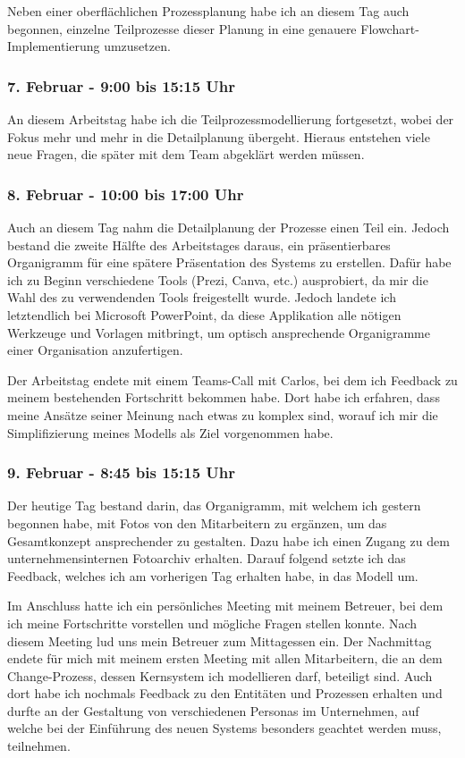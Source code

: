 Neben einer oberflächlichen Prozessplanung habe ich an diesem Tag auch begonnen, einzelne Teilprozesse dieser Planung in eine genauere Flowchart-Implementierung umzusetzen.

\subsubsection*{7. Februar - 9:00 bis 15:15 Uhr}
An diesem Arbeitstag habe ich die Teilprozessmodellierung fortgesetzt, wobei der Fokus mehr und mehr in die Detailplanung übergeht. Hieraus entstehen viele neue Fragen, die später mit dem Team abgeklärt werden müssen.

\subsubsection*{8. Februar - 10:00 bis 17:00 Uhr}
Auch an diesem Tag nahm die Detailplanung der Prozesse einen Teil ein. Jedoch bestand die zweite Hälfte des Arbeitstages daraus, ein präsentierbares Organigramm für eine spätere Präsentation des Systems zu erstellen. Dafür habe ich zu Beginn verschiedene Tools (Prezi, Canva, etc.) ausprobiert, da mir die Wahl des zu verwendenden Tools freigestellt wurde. Jedoch landete ich letztendlich bei Microsoft PowerPoint, da diese Applikation alle nötigen Werkzeuge und Vorlagen mitbringt, um optisch ansprechende Organigramme einer Organisation anzufertigen. 

Der Arbeitstag endete mit einem Teams-Call mit Carlos, bei dem ich Feedback zu meinem bestehenden Fortschritt bekommen habe. Dort habe ich erfahren, dass meine Ansätze seiner Meinung nach etwas zu komplex sind, worauf ich mir die Simplifizierung meines Modells als Ziel vorgenommen habe.

\subsubsection*{9. Februar - 8:45 bis 15:15 Uhr}
Der heutige Tag bestand darin, das Organigramm, mit welchem ich gestern begonnen habe, mit Fotos von den Mitarbeitern zu ergänzen, um das Gesamtkonzept ansprechender zu gestalten. Dazu habe ich einen Zugang zu dem unternehmensinternen Fotoarchiv erhalten.
Darauf folgend setzte ich das Feedback, welches ich am vorherigen Tag erhalten habe, in das Modell um.

Im Anschluss hatte ich ein persönliches Meeting mit meinem Betreuer, bei dem ich meine Fortschritte vorstellen und mögliche Fragen stellen konnte. Nach diesem Meeting lud uns mein Betreuer zum Mittagessen ein. Der Nachmittag endete für mich mit meinem ersten Meeting mit allen Mitarbeitern, die an dem Change-Prozess, dessen Kernsystem ich modellieren darf, beteiligt sind. Auch dort habe ich nochmals Feedback zu den Entitäten und Prozessen erhalten und durfte an der Gestaltung von verschiedenen Personas im Unternehmen, auf welche bei der Einführung des neuen Systems besonders geachtet werden muss, teilnehmen.

